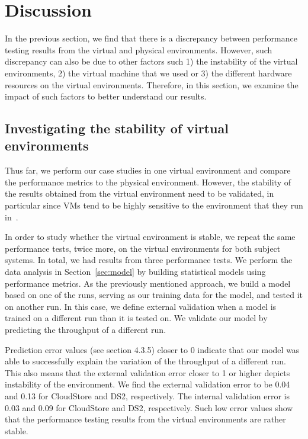 \documentclass[smallextended]{svjour3}       %
\begin{document}
\section{Discussion}
\label{sec:discussion}

In the previous section, we find that there is a discrepancy between performance testing results from the virtual and physical environments. However, such discrepancy can also be due to other factors such 1) the instability of the virtual environments, 2) the virtual machine that we used or 3) the different hardware resources on the virtual environments. Therefore, in this section, we examine the impact of such factors to better understand our results. 


\subsection{Investigating the stability of virtual environments}

Thus far, we perform our case studies in one virtual environment and compare the performance metrics to the physical environment. However, the stability of the results obtained from the virtual environment need to be validated, in particular since VMs tend to be highly sensitive to the environment that they run in~\cite{leitner}.
 

In order to study whether the virtual environment is stable, we repeat the same performance tests, twice more, on the virtual environments for both subject systems. In total, we had results from three performance tests. We perform the data analysis in Section~\ref{sec:model} by building statistical models using performance metrics. %
As the previously mentioned approach, we build a model based on one of the runs, serving as our training data for the model, and tested it on another run. In this case, we define external validation when a model is trained on a different run than it is tested on. We validate our model by predicting the throughput of a different run.  

Prediction error values (see section 4.3.5) closer to 0 indicate that our model was able to successfully explain the variation of the throughput of a different run. This also means that the external validation error closer to 1 or higher depicts instability of the environment. We find the external validation error to be 0.04 and 0.13 for CloudStore and DS2, respectively. The internal validation error is 0.03 and 0.09 for CloudStore and DS2, respectively. Such low error values show that the performance testing results from the virtual environments are rather stable. 
\end{document}
